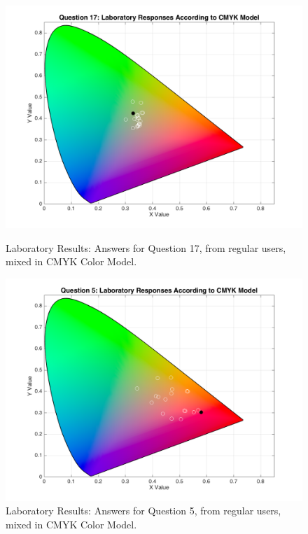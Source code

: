 \begin{figure}[htbp]
  \centering
  \begin{minipage}{0.48\textwidth}
    \centering
    \includegraphics[width=\textwidth]{images/17_lab_CMYKresponses.png}
    \caption[Laboratory Results: Answers for Question 17, from regular users, mixed in CMYK Color Model.]{Laboratory Results: Answers for Question 17, from regular users, mixed in CMYK Color Model.}
    \label{fig:labcmykregular_17}
  \end{minipage}\hfill
  \begin{minipage}{0.48\textwidth}
    \centering
    \includegraphics[width=\textwidth]{images/5_lab_CMYKresponses.png}
    \caption[Laboratory Results: Answers for Question 5, from regular users, mixed in CMYK Color Model.]{Laboratory Results: Answers for Question 5, from regular users, mixed in CMYK Color Model.}
    \label{fig:labcmykregular_5}
  \end{minipage}
\end{figure}

